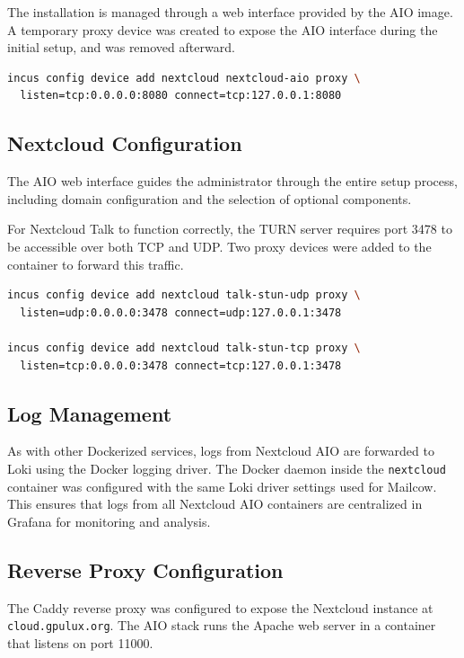 The installation is managed through a web interface provided by the AIO image. A temporary proxy device was created to expose the AIO interface during the initial setup, and was removed afterward.

\begin{lstlisting}[language=bash,caption={Temporarily exposing the Nextcloud AIO interface.}]
incus config device add nextcloud nextcloud-aio proxy \
  listen=tcp:0.0.0.0:8080 connect=tcp:127.0.0.1:8080
\end{lstlisting}

\subsection*{Nextcloud Configuration}

The AIO web interface guides the administrator through the entire setup process, including domain configuration and the selection of optional components.

For Nextcloud Talk to function correctly, the TURN server requires port 3478 to be accessible over both TCP and UDP. Two proxy devices were added to the container to forward this traffic.

\begin{lstlisting}[language=bash,caption={Forwarding ports for Nextcloud Talk.}]
incus config device add nextcloud talk-stun-udp proxy \
  listen=udp:0.0.0.0:3478 connect=udp:127.0.0.1:3478

incus config device add nextcloud talk-stun-tcp proxy \
  listen=tcp:0.0.0.0:3478 connect=tcp:127.0.0.1:3478
\end{lstlisting}

\subsection*{Log Management}

As with other Dockerized services, logs from Nextcloud AIO are forwarded to Loki using the Docker logging driver. The Docker daemon inside the \texttt{nextcloud} container was configured with the same Loki driver settings used for Mailcow. This ensures that logs from all Nextcloud AIO containers are centralized in Grafana for monitoring and analysis.

\subsection*{Reverse Proxy Configuration}

The Caddy reverse proxy was configured to expose the Nextcloud instance at \texttt{cloud.gpulux.org}. The AIO stack runs the Apache web server in a container that listens on port 11000.

